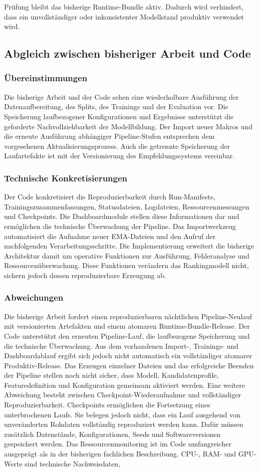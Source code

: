 Prüfung bleibt das bisherige Runtime-Bundle aktiv. Dadurch wird verhindert, dass ein unvollständiger oder inkonsistenter Modellstand produktiv verwendet wird. \subsection{Abgleich zwischen bisheriger Arbeit und Code} \label{subsec:abgleich_reproduzierbarkeit} \subsubsection*{Übereinstimmungen} Die bisherige Arbeit und der Code sehen eine wiederholbare Ausführung der Datenaufbereitung, des Splits, des Trainings und der Evaluation vor. Die Speicherung laufbezogener Konfigurationen und Ergebnisse unterstützt die geforderte Nachvollziehbarkeit der Modellbildung. Der Import neuer Makros und die erneute Ausführung abhängiger Pipeline-Stufen entsprechen dem vorgesehenen Aktualisierungsprozess. Auch die getrennte Speicherung der Laufartefakte ist mit der Versionierung des Empfehlungssystems vereinbar. \subsubsection*{Technische Konkretisierungen} Der Code konkretisiert die Reproduzierbarkeit durch Run-Manifeste, Trainingszusammenfassungen, Statusdateien, Logdateien, Ressourcenmessungen und Checkpoints. Die Dashboardmodule stellen diese Informationen dar und ermöglichen die technische Überwachung der Pipeline. Das Importwerkzeug automatisiert die Aufnahme neuer EMA-Dateien und den Aufruf der nachfolgenden Verarbeitungsschritte. Die Implementierung erweitert die bisherige Architektur damit um operative Funktionen zur Ausführung, Fehleranalyse und Ressourcenüberwachung. Diese Funktionen verändern das Rankingmodell nicht, sichern jedoch dessen reproduzierbare Erzeugung ab. \subsubsection*{Abweichungen} Die bisherige Arbeit fordert einen reproduzierbaren nächtlichen Pipeline-Neulauf mit versionierten Artefakten und einem atomaren Runtime-Bundle-Release. Der Code unterstützt den erneuten Pipeline-Lauf, die laufbezogene Speicherung und die technische Überwachung. Aus dem vorhandenen Import-, Trainings- und Dashboardablauf ergibt sich jedoch nicht automatisch ein vollständiger atomarer Produktiv-Release. Das Erzeugen einzelner Dateien und das erfolgreiche Beenden der Pipeline stellen noch nicht sicher, dass Modell, Kandidatenprofile, Featuredefinition und Konfiguration gemeinsam aktiviert werden. Eine weitere Abweichung besteht zwischen Checkpoint-Wiederaufnahme und vollständiger Reproduzierbarkeit. Checkpoints ermöglichen die Fortsetzung eines unterbrochenen Laufs. Sie belegen jedoch nicht, dass ein Lauf ausgehend von unveränderten Rohdaten vollständig reproduziert werden kann. Dafür müssen zusätzlich Datenstände, Konfigurationen, Seeds und Softwareversionen gespeichert werden. Das Ressourcenmonitoring ist im Code umfangreicher ausgeprägt als in der bisherigen fachlichen Beschreibung. CPU-, RAM- und GPU-Werte sind technische Nachweisdaten, 